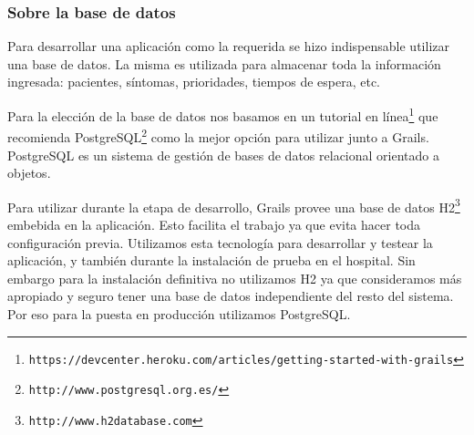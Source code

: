 \subsubsection{Sobre la base de datos}
Para desarrollar una aplicación como la requerida se hizo indispensable utilizar una base de datos. La misma es utilizada para almacenar toda la información ingresada: pacientes, síntomas, prioridades, tiempos de espera, etc.

Para la elección de la base de datos nos basamos en un tutorial en línea\footnote{\texttt{https://devcenter.heroku.com/articles/getting-started-with-grails}} que recomienda PostgreSQL\footnote{\texttt{http://www.postgresql.org.es/}} como la mejor opción para utilizar junto a Grails. PostgreSQL es un sistema de gestión de bases de datos relacional orientado a objetos.

Para utilizar durante la etapa de desarrollo, Grails provee una base de datos H2\footnote{\texttt{http://www.h2database.com}} embebida en la aplicación. Esto facilita el trabajo ya que evita hacer toda configuración previa. Utilizamos esta tecnología para desarrollar y testear la aplicación, y también durante la instalación de prueba en el hospital. Sin embargo para la instalación definitiva no utilizamos H2 ya que consideramos más apropiado y seguro tener una base de datos independiente del resto del sistema. Por eso para la puesta en producción utilizamos PostgreSQL.